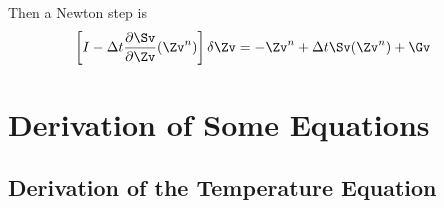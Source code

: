 \documentclass[10pt]{article}
\begin{document}
Then a Newton step is
\begin{align*}
  \left[I - \dt {\partial \Sv \over\partial \Zv}(\Zv^n)\right] \delta\Zv & = -\Zv^n + \dt \Sv(\Zv^n) + \Gv
\end{align*}


\section{Derivation of Some Equations}

\subsection{Derivation of the Temperature Equation}\label{sec:temperature}
\end{document}
